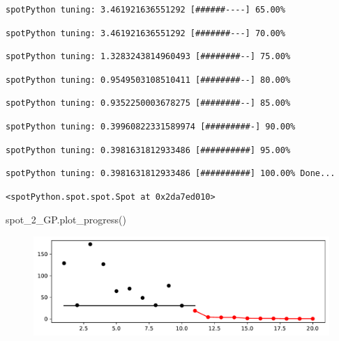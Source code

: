 \documentclass[
  letterpaper,
  DIV=11,
  numbers=noendperiod]{scrreprt}
\newenvironment{Shaded}{\begin{snugshade}}{\end{snugshade}}
\newcommand{\NormalTok}[1]{\textcolor[rgb]{0.00,0.23,0.31}{#1}}
\begin{document}
\begin{verbatim}
spotPython tuning: 3.461921636551292 [######----] 65.00% 
\end{verbatim}

\begin{verbatim}
spotPython tuning: 3.461921636551292 [#######---] 70.00% 
\end{verbatim}

\begin{verbatim}
spotPython tuning: 1.3283243814960493 [########--] 75.00% 
\end{verbatim}

\begin{verbatim}
spotPython tuning: 0.9549503108510411 [########--] 80.00% 
\end{verbatim}

\begin{verbatim}
spotPython tuning: 0.9352250003678275 [########--] 85.00% 
\end{verbatim}

\begin{verbatim}
spotPython tuning: 0.39960822331589974 [#########-] 90.00% 
\end{verbatim}

\begin{verbatim}
spotPython tuning: 0.3981631812933486 [##########] 95.00% 
\end{verbatim}

\begin{verbatim}
spotPython tuning: 0.3981631812933486 [##########] 100.00% Done...
\end{verbatim}

\begin{verbatim}
<spotPython.spot.spot.Spot at 0x2da7ed010>
\end{verbatim}

\begin{Shaded}
\begin{Highlighting}[]
\NormalTok{spot\_2\_GP.plot\_progress()}
\end{Highlighting}
\end{Shaded}

\begin{figure}[H]

{\centering \includegraphics{010_num_spot_sklearn_surrogate_files/figure-pdf/cell-18-output-1.pdf}

}

\end{figure}
\end{document}
